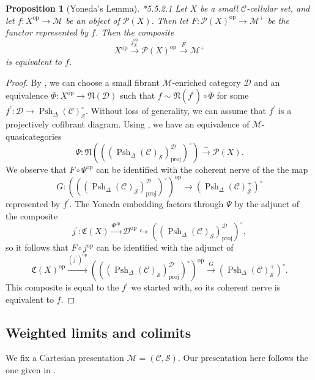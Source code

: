 \documentclass[a4paper]{article}
\numberwithin{equation}{subsection}
\theoremstyle{plain}   %
\newtheorem{prop}[equation]{Proposition}
\theoremstyle{definition}
\theoremstyle{remark}
\theoremstyle{plain}
\newcommand{\op}{\ensuremath{\mathrm{op}}}
\providecommand{\C}{}
\renewcommand{\C}{\ensuremath{\mathcal{C}}}
\newcommand{\M}{\ensuremath{\mathcal{M}}}
\newcommand{\Pre}{\ensuremath{\mathcal{P}}}
\newcommand{\setS}{\ensuremath{\mathscr{S}}}
\newcommand{\spsh}{\ensuremath{\operatorname{Psh}_\Delta(\mathcal{C})}}
\begin{document}
\begin{prop}[Yoneda's Lemma]\cite{htt}*{5.5.2.1}
	Let \(X\) be a small \(\C\)-cellular set, and let \(f: X^\op \to \M\) be an object of \(\Pre(X)\).  Then let \(F:\Pre(X)^\op \to \M^+\) be the functor represented by \(f\).  Then the composite \[X^\op\xrightarrow{j^\op_X} \Pre(X)^\op \xrightarrow{F} \M^+\] is equivalent to \(f\).
\end{prop}
\begin{proof}
	By , we can choose a small fibrant \(\M\)-enriched category \(\mathcal{D}\) and an equivalence \(\Phi:X^\op\to \mathfrak{N}(\mathcal{D})\) such that \(f\sim \mathfrak{N}(f^\prime) \circ \Phi\) for some \(f^\prime:\mathcal{D} \to \spsh_\setS^\circ\).  Without loss of generality, we can assume that \(f^\prime\) is a projectively cofibrant diagram.  Using , we have an equivalence of \(\M\)-quasicategories 
	\[\Psi:\mathfrak{N}\left(\left((\spsh_\setS)_\mathrm{proj}^\mathcal{D}\right)^\circ\right) \xrightarrow{\sim} \Pre(X).\] 
	We observe that \(F\circ \Psi^\op\) can be identified with the coherent nerve of the the map 
	\[G: \left(\left((\spsh_\setS)_\mathrm{proj}^\mathcal{D}\right)^\circ\right)^\op \to \left(\spsh^{+}_\setS\right)^\circ\] represented by \(f^\prime\).  The Yoneda embedding factors through \(\Psi\) by the adjunct of the composite 
	\[j^\prime:\mathfrak{C}(X)\xrightarrow{\Phi^\op} \mathcal{D}^\op \hookrightarrow \left((\spsh_\setS)_\mathrm{proj}^\mathcal{D}\right)^\circ,\]
	so it follows that \(F\circ j^\op\) can be identified with the adjunct of 
	\[\mathfrak{C}(X)^\op \xrightarrow{(j^\prime)^\op} \left(\left((\spsh_\setS)_\mathrm{proj}^\mathcal{D}\right)^\circ\right)^\op \xrightarrow{G} \left(\spsh^{+}_\setS\right)^\circ.\]
	This composite is equal to the \(f^\prime\) we started with, so its coherent nerve is equivalent to \(f\).
\end{proof}

\subsection{Weighted limits and colimits}
We fix a Cartesian presentation \(\M=(\C,\setS)\).  Our presentation here follows the one given in \cite{nlabwlim}.
\end{document}
